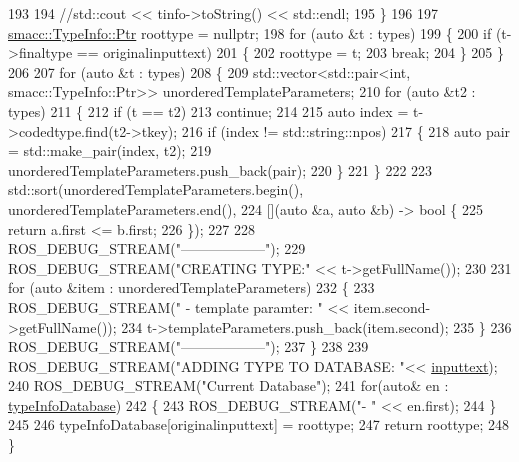 \begin{DoxyCode}
193 
194         \textcolor{comment}{//std::cout << tinfo->toString() << std::endl;}
195     \}
196 
197     \hyperlink{classsmacc_1_1TypeInfo_aca0cd51c7c9ef85f6c98dc32878af226}{smacc::TypeInfo::Ptr} roottype = \textcolor{keyword}{nullptr};
198     \textcolor{keywordflow}{for} (\textcolor{keyword}{auto} &t : types)
199     \{
200         \textcolor{keywordflow}{if} (t->finaltype == originalinputtext)
201         \{
202             roottype = t;
203             \textcolor{keywordflow}{break};
204         \}
205     \}
206 
207     \textcolor{keywordflow}{for} (\textcolor{keyword}{auto} &t : types)
208     \{
209         std::vector<std::pair<int, smacc::TypeInfo::Ptr>> unorderedTemplateParameters;
210         \textcolor{keywordflow}{for} (\textcolor{keyword}{auto} &t2 : types)
211         \{
212             \textcolor{keywordflow}{if} (t == t2)
213                 \textcolor{keywordflow}{continue};
214 
215             \textcolor{keyword}{auto} index = t->codedtype.find(t2->tkey);
216             \textcolor{keywordflow}{if} (index != std::string::npos)
217             \{
218                 \textcolor{keyword}{auto} pair = std::make\_pair(index, t2);
219                 unorderedTemplateParameters.push\_back(pair);
220             \}
221         \}
222 
223         std::sort(unorderedTemplateParameters.begin(), unorderedTemplateParameters.end(),
224                   [](\textcolor{keyword}{auto} &a, \textcolor{keyword}{auto} &b) -> \textcolor{keywordtype}{bool} \{
225                       \textcolor{keywordflow}{return} a.first <= b.first;
226                   \});
227 
228         ROS\_DEBUG\_STREAM(\textcolor{stringliteral}{"------------------"});
229         ROS\_DEBUG\_STREAM(\textcolor{stringliteral}{"CREATING TYPE:"} << t->getFullName());
230 
231         \textcolor{keywordflow}{for} (\textcolor{keyword}{auto} &item : unorderedTemplateParameters)
232         \{
233             ROS\_DEBUG\_STREAM(\textcolor{stringliteral}{" - template paramter: "} << item.second->getFullName());
234             t->templateParameters.push\_back(item.second);
235         \}
236         ROS\_DEBUG\_STREAM(\textcolor{stringliteral}{"------------------"});
237     \}
238 
239     ROS\_DEBUG\_STREAM(\textcolor{stringliteral}{"ADDING TYPE TO DATABASE: "}<< \hyperlink{namespaceregex__template_a5e23ed7a5dae7db8eb3cdae8fb3e3230}{inputtext});
240     ROS\_DEBUG\_STREAM(\textcolor{stringliteral}{"Current Database"});
241     \textcolor{keywordflow}{for}(\textcolor{keyword}{auto}& en : \hyperlink{classsmacc_1_1TypeInfo_a5dafa5950a93f6cd5b88d5ea573a504c}{typeInfoDatabase})
242     \{
243         ROS\_DEBUG\_STREAM(\textcolor{stringliteral}{"- "} << en.first);
244     \}
245 
246     typeInfoDatabase[originalinputtext] = roottype;
247     \textcolor{keywordflow}{return} roottype;
248 \}
\end{DoxyCode}



